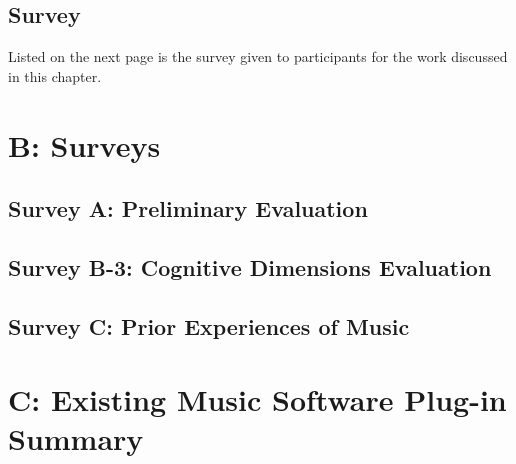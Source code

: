 \label{app:composerSurvey}

\section{Survey}
Listed on the next page is the survey given to participants for the work discussed in this chapter.



%
%



\chapter{B: Surveys}
\label{app:survey}
\section{Survey A: Preliminary Evaluation}

\section{Survey B-3: Cognitive Dimensions Evaluation}

\section{Survey C: Prior Experiences of Music}


\chapter{C: Existing Music Software Plug-in Summary}
\label{app:pluginsum}


